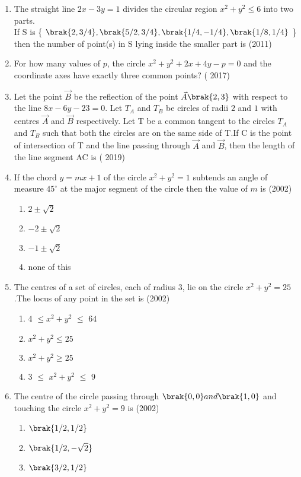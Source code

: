 \begin{enumerate}
\item The straight line $2x-3y=1$ divides the circular region $x^2+y^2\leq6$ into two parts.\\
If  S  is \{ $\brak{2, 3/4}, \brak{5/2, 3/4}, \brak{1/4, -1/4}, \brak{1/8, 1/4}$ \}  then the  number of point(s) in S lying inside the smaller part is \hfill(2011)
\item For how many values of $p$,  the circle $x^2+y^2+2x+4y-p=0$ and the coordinate axes have exactly three common points? \hfill( 2017)
\\
\item Let the point $\vec{B}$ be the reflection of the point $\vec{A}\brak{2, 3}$ with respect to the line $8x-6y-23=0$. Let $T_A$ and $T_B$ be circles of radii $2$ and $1$ with centres $\vec{A}$ and $\vec{B}$ respectively. Let T be a common tangent to the circles $T_A$ and $T_B$ such that both the circles are on the same side of T.If C is the point of intersection of T and the line passing through $\vec{A}$ and $\vec{B}$, then the length of the line segment AC is \hfill( 2019)
\item If the chord $y=mx+1$ of the circle $x^2+y^2=1$ subtends an angle of measure \( 45^\circ \) at the major segment of the circle then the value of $m$ is \hfill(2002)
\begin{enumerate}
\item$2\pm\sqrt{2}$
\item$-2\pm\sqrt{2}$
\item$-1\pm\sqrt{2}$
\item none of this
\end{enumerate}
\item The centres of a set of circles, each of radius $3$,  lie on the circle $x^2+y^2=25$.The locus of any point in the set is \hfill(2002)
\begin{enumerate}
\item$4$ $\leq$$x^2+y^2$ $\leq$ $64$
\item$x^2+y^2\leq25$
\item$x^2+y^2\geq25$
\item$3$ $\leq$ $x^2+y^2$ $\leq$ $9$
\end{enumerate}
\item The centre of the circle passing through $\brak{0, 0} and \brak{1, 0}$ and touching the circle $x^2+y^2=9$ is \hfill(2002)
\begin{enumerate}
\item$\brak{1/2, 1/2}$
\item$\brak{1/2, -\sqrt{2}}$
\item$\brak{3/2, 1/2}$

\end{enumerate}
\end{enumerate}
